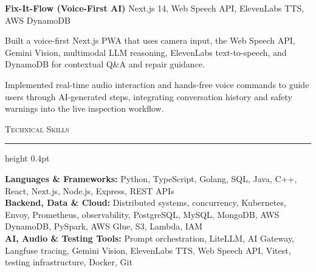 \documentclass[letterpaper,11pt]{article}
\newcommand{\resumesection}[1]{%
  \par\vspace{2pt}%
  {\large\scshape #1}\par\vspace{2pt}%
  \hrule height 0.4pt\vspace{2pt}%
}
\newcommand{\projectHeading}[2]{
  \textbf{#1} \hfill #2
}
\begin{document}
\projectHeading{Fix-It-Flow (Voice-First AI)}{Next.js 14, Web Speech API, ElevenLabs TTS, AWS DynamoDB}
\begin{tightitemize}
  \item Built a voice-first Next.js PWA that uses camera input, the Web Speech API, Gemini Vision, multimodal LLM reasoning, ElevenLabs text-to-speech, and DynamoDB for contextual Q\&A and repair guidance.
  \item Implemented real-time audio interaction and hands-free voice commands to guide users through AI-generated steps, integrating conversation history and safety warnings into the live inspection workflow.
\end{tightitemize}

\resumesection{Technical Skills}
\textbf{Languages \& Frameworks:} Python, TypeScript, Golang, SQL, Java, C++, React, Next.js, Node.js, Express, REST APIs\\
\textbf{Backend, Data \& Cloud:} Distributed systems, concurrency, Kubernetes, Envoy, Prometheus, observability, PostgreSQL, MySQL, MongoDB, AWS DynamoDB, PySpark, AWS Glue, S3, Lambda, IAM\\
\textbf{AI, Audio \& Testing Tools:} Prompt orchestration, LiteLLM, AI Gateway, Langfuse tracing, Gemini Vision, ElevenLabs TTS, Web Speech API, Vitest, testing infrastructure, Docker, Git
\end{document}
